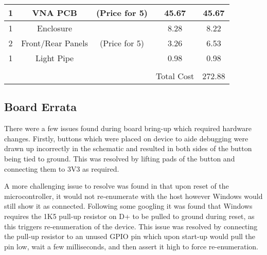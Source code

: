 \begin{table}[H]
\begin{tabular}{|c|c|c|c|c|}
		1                 & VNA PCB                    & (Price for 5)            & 45.67                                                                 & 45.67                                                                     \\ \hline
		1                 & Enclosure                  &                          & 8.28                                                                  & 8.22                                                                      \\ \hline
		2                 & Front/Rear Panels         & (Price for 5)            & 3.26                                                                  & 6.53                                                                      \\ \hline
		1                 & Light Pipe                 &                          & 0.98                                                                   & 0.98                                                                       \\ \hline
		&                            &                          &                                                                        &                                                                            \\ \hline
		&                            &                          & Total Cost                                                             & 272.88                                                                    \\ \hline
	\end{tabular}
\end{table} 

\subsection{Board Errata}
There were a few issues found during board bring-up which required hardware changes. Firstly, buttons which were placed on device to aide debugging were drawn up incorrectly in the schematic and resulted in both sides of the button being tied to ground. This was resolved by lifting pads of the button and connecting them to 3V3 as required.

A more challenging issue to resolve was found in that upon reset of the microcontroller, it would not re-enumerate with the host however Windows would still show it as connected. Following some googling it was found that Windows requires the 1K5 pull-up resistor on D+ to be pulled to ground during reset, as this triggers re-enumeration of the device. This issue was resolved by connecting the pull-up resistor to an unused GPIO pin which upon start-up would pull the pin low, wait a few milliseconds, and then assert it high to force re-enumeration. 

